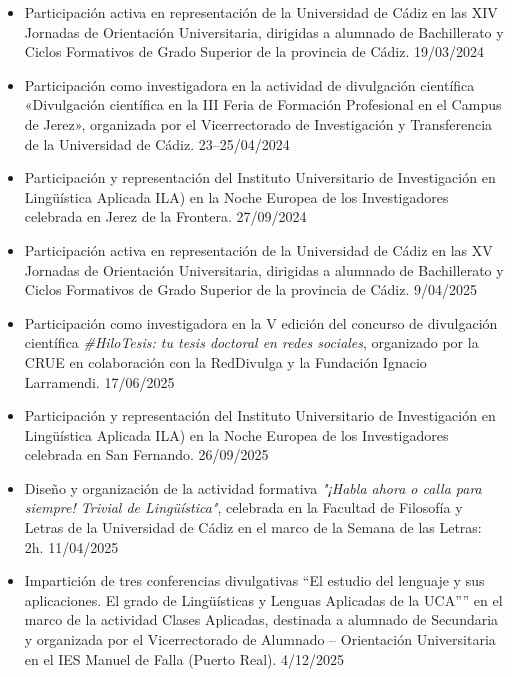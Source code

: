 \begin{enumerate}[label=\alph*)]
\begin{itemize}
            \item Participación activa en representación de la Universidad de Cádiz en las XIV Jornadas de Orientación Universitaria, dirigidas a alumnado de Bachillerato y Ciclos Formativos de Grado Superior de la provincia de Cádiz. \hfill 19/03/2024
            
            \item Participación como investigadora en la actividad de divulgación científica «Divulgación científica en la III Feria de Formación Profesional en el Campus de Jerez», organizada por el Vicerrectorado de Investigación y Transferencia de la Universidad de Cádiz. \hfill 23–25/04/2024
            
            \item Participación y representación del Instituto Universitario de Investigación en Lingüística Aplicada ILA) en la Noche Europea de los Investigadores celebrada en Jerez de la Frontera. \hfill 27/09/2024

            \item Participación activa en representación de la Universidad de Cádiz en las XV Jornadas de Orientación Universitaria, dirigidas a alumnado de Bachillerato y Ciclos Formativos de Grado Superior de la provincia de Cádiz. \hfill 9/04/2025
            
            \item Participación como investigadora en la V edición del concurso de divulgación científica \textit{\#HiloTesis: tu tesis doctoral en redes sociales}, organizado por la CRUE en colaboración con la RedDivulga y la Fundación Ignacio Larramendi. \hfill 17/06/2025
            
            \item Participación y representación del Instituto Universitario de Investigación en Lingüística Aplicada ILA) en la Noche Europea de los Investigadores celebrada en San Fernando. \hfill 26/09/2025

            \item Diseño y organización de la actividad formativa \textit{"¡Habla ahora o calla para siempre! Trivial de Lingüística"}, celebrada en la Facultad de Filosofía y Letras de la Universidad de Cádiz en el marco de la Semana de las Letras: 2h. \hfill 11/04/2025

            \item Impartición de tres conferencias divulgativas “El estudio del lenguaje y sus aplicaciones. El grado de Lingüísticas y Lenguas Aplicadas de la UCA”” en el marco de la actividad Clases Aplicadas, destinada a alumnado de Secundaria y organizada por el Vicerrectorado de Alumnado – Orientación Universitaria en el IES Manuel de Falla (Puerto Real). \hfill 4/12/2025


\end{itemize}
\end{enumerate}
